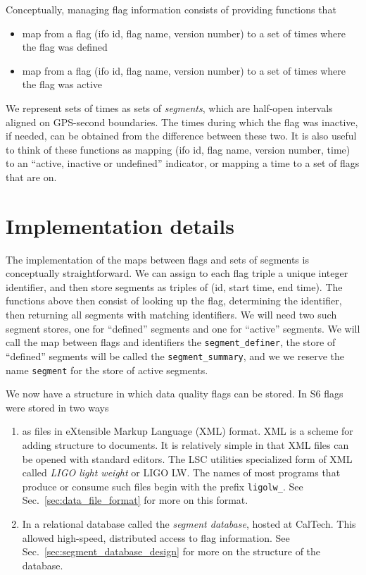 Conceptually, managing flag information consists of providing
functions that
%
\begin{itemize}
\item map from a flag (ifo id, flag name, version number) to a set of
times where the flag was defined
\item map from a flag (ifo id, flag name, version number) to a set of
times where the flag was active
\end{itemize}
%
We represent sets of times as sets of \emph{segments}, which are
half-open intervals aligned on GPS-second boundaries.  The times
during which the flag was inactive, if needed, can be obtained from the
difference between these two.  It is also useful to think of these
functions as mapping (ifo id, flag name, version number, time) to an
``active, inactive or undefined'' indicator, or mapping a time to a
set of flags that are on.






\section{Implementation details}

The implementation of the maps between flags and sets of segments is
conceptually straightforward.  We can assign to each flag triple a
unique integer identifier, and then store segments as triples of (id, start
time, end time).  The functions above then consist of looking up the
flag, determining the identifier, then returning all segments with
matching identifiers.  We will need two such segment stores, one for
``defined'' segments and one for ``active'' segments.  We will call the
map between flags and identifiers the \texttt{segment\_definer}, the
store of ``defined'' segments will be called the
\texttt{segment\_summary}, and we we reserve the name \texttt{segment}
for the store of active segments.

We now have a structure in which data quality flags can be stored.
In S6 flags were stored in two ways
%
\begin{enumerate}
\item as files in eXtensible Markup Language (XML) format.  XML is a
scheme for adding structure to documents.  It is relatively
simple in that XML files can be opened with standard editors.  The LSC
utilities specialized form of XML called \emph{LIGO light weight} or
LIGO LW.  The names of most programs that produce or consume such files
begin with the prefix \texttt{ligolw\_}.  See
Sec.~\ref{sec:data_file_format} for more on this format.

\item In a relational database called the \emph{segment database},
hosted at CalTech.  This allowed high-speed, distributed
access to flag information.  See
Sec.~\ref{sec:segment_database_design} for more on the structure of
the database.
\end{enumerate}



